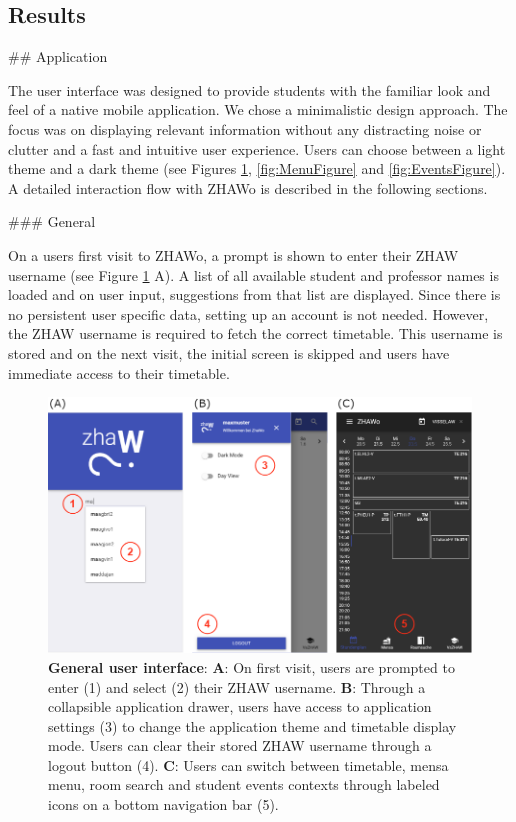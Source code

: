 \begin{markdown}
\section{Results} \label{results}

## Application

The user interface was designed to provide students with the familiar look and feel of a native mobile application. We chose a minimalistic design approach. The focus was on displaying relevant information without any distracting noise or clutter and a fast and intuitive user experience. Users can choose between a light theme and a dark theme (see Figures \ref{fig:LoginFigure}, \ref{fig:MenuFigure} and \ref{fig:EventsFigure}). A detailed interaction flow with ZHAWo is described in the following sections.

### General

On a users first visit to ZHAWo, a prompt is shown to enter their ZHAW username (see Figure \ref{fig:LoginFigure} A). A list of all available student and professor names is loaded and on user input, suggestions from that list are displayed. Since there is no persistent user specific data, setting up an account is not needed. However, the ZHAW username is required to fetch the correct timetable. This username is stored and on the next visit, the initial screen is skipped and users have immediate access to their timetable.

\begin{figure}[H]
  \includegraphics[width=16cm, center]{./figures/login_figure.png}
  \captionsetup{width=15.5cm}
  \caption[General user interface]{\textbf{General user interface}: \textbf{A}: On first visit, users are prompted to enter (1) and select (2) their ZHAW username. \textbf{B}: Through a collapsible application drawer, users have access to application settings (3) to change the application theme and timetable display mode. Users can clear their stored ZHAW username through a logout button (4). \textbf{C}: Users can switch between timetable, mensa menu, room search and student events contexts through labeled icons on a bottom navigation bar (5).}
  \label{fig:LoginFigure}
\end{figure}


\end{markdown}
